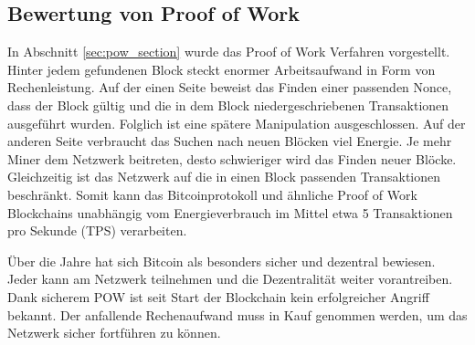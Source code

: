 \subsection{Bewertung von Proof of Work}
In Abschnitt \eqref{sec:pow_section} wurde das Proof of Work Verfahren vorgestellt. Hinter jedem gefundenen Block steckt enormer Arbeitsaufwand in Form von Rechenleistung. Auf der einen Seite beweist das Finden einer passenden Nonce, dass der Block gültig und die in dem Block niedergeschriebenen Transaktionen ausgeführt wurden. Folglich ist eine spätere Manipulation ausgeschlossen. Auf der anderen Seite verbraucht das Suchen nach neuen Blöcken viel Energie. Je mehr Miner dem Netzwerk beitreten, desto schwieriger wird das Finden neuer Blöcke. Gleichzeitig ist das Netzwerk auf die in einen Block passenden Transaktionen beschränkt. Somit kann das Bitcoinprotokoll und ähnliche Proof of Work Blockchains unabhängig vom Energieverbrauch im Mittel etwa 5 Transaktionen pro Sekunde (TPS) verarbeiten. \cite{Cai.2019}

Über die Jahre hat sich Bitcoin als besonders sicher und dezentral bewiesen. Jeder kann am Netzwerk teilnehmen und die Dezentralität weiter vorantreiben. Dank sicherem POW ist seit Start der Blockchain kein erfolgreicher Angriff bekannt. Der anfallende Rechenaufwand muss in Kauf genommen werden, um das Netzwerk sicher fortführen zu können.